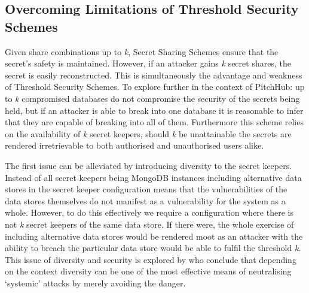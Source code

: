 \subsection{Overcoming Limitations of Threshold Security Schemes}
Given share combinations up to \textit{k}, Secret Sharing Schemes ensure that the secret's safety is maintained. However, if an attacker gains \textit{k} secret shares, the secret is easily reconstructed. This is simultaneously the advantage and weakness of Threshold Security Schemes. To explore further in the context of PitchHub: up to \textit{k} compromised databases do not compromise the security of the secrets being held, but if an attacker is able to break into one database it is reasonable to infer that they are capable of breaking into all of them. Furthermore this scheme relies on the availability of \textit{k} secret keepers, should \textit{k} be unattainable the secrets are rendered irretrievable to both authorised and unauthorised users alike.
\par
The first issue can be alleviated by introducing diversity to the secret keepers. Instead of all secret keepers being MongoDB instances including alternative data stores in the secret keeper configuration means that the vulnerabilities of the data stores themselves do not manifest as a vulnerability for the system as a whole. However, to do this effectively we require a configuration where there is not \textit{k} secret keepers of the same data store. If there were, the whole exercise of including alternative data stores would be rendered moot as an attacker with the ability to breach the particular data store would be able to fulfil the threshold \textit{k}. This issue of diversity and security is explored by \citeauthor{littlewood2004redundancy} who conclude that depending on the context diversity can be one of the most effective means of neutralising `systemic' attacks by merely avoiding the danger.
\par
